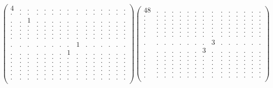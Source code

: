 \documentclass[12pt,a4paper]{amsart}
\begin{document}
\begin{align*}
\left(\begin{array}{rrrrrrrrrrrrrrr}%
4&.&.&.&.&.&.&.&.&.&.&.&.&.&.\\%
.&.&.&.&.&.&.&.&.&.&.&.&.&.&.\\%
.&.&1&.&.&.&.&.&.&.&.&.&.&.&.\\%
.&.&.&.&.&.&.&.&.&.&.&.&.&.&.\\%
.&.&.&.&.&.&.&.&.&.&.&.&.&.&.\\%
.&.&.&.&.&.&.&.&.&.&.&.&.&.&.\\%
.&.&.&.&.&.&.&.&.&.&.&.&.&.&.\\%
.&.&.&.&.&.&.&.&1&.&.&.&.&.&.\\%
.&.&.&.&.&.&.&1&.&.&.&.&.&.&.\\%
.&.&.&.&.&.&.&.&.&.&.&.&.&.&.\\%
.&.&.&.&.&.&.&.&.&.&.&.&.&.&.\\%
.&.&.&.&.&.&.&.&.&.&.&.&.&.&.\\%
.&.&.&.&.&.&.&.&.&.&.&.&.&.&.\\%
.&.&.&.&.&.&.&.&.&.&.&.&.&.&.\\%
.&.&.&.&.&.&.&.&.&.&.&.&.&.&.\\%
\end{array}\right)%
\left(\begin{array}{rrrrrrrrrrrrrrr}%
48&.&.&.&.&.&.&.&.&.&.&.&.&.&.\\%
.&.&.&.&.&.&.&.&.&.&.&.&.&.&.\\%
.&.&.&.&.&.&.&.&.&.&.&.&.&.&.\\%
.&.&.&.&.&.&.&.&.&.&.&.&.&.&.\\%
.&.&.&.&.&.&.&.&.&.&.&.&.&.&.\\%
.&.&.&.&.&.&.&.&.&.&.&.&.&.&.\\%
.&.&.&.&.&.&.&.&.&.&.&.&.&.&.\\%
.&.&.&.&.&.&.&.&3&.&.&.&.&.&.\\%
.&.&.&.&.&.&.&3&.&.&.&.&.&.&.\\%
.&.&.&.&.&.&.&.&.&.&.&.&.&.&.\\%
.&.&.&.&.&.&.&.&.&.&.&.&.&.&.\\%
.&.&.&.&.&.&.&.&.&.&.&.&.&.&.\\%
.&.&.&.&.&.&.&.&.&.&.&.&.&.&.\\%
.&.&.&.&.&.&.&.&.&.&.&.&.&.&.\\%
.&.&.&.&.&.&.&.&.&.&.&.&.&.&.\\%
\end{array}\right)%
\end{align*}
\end{document}
